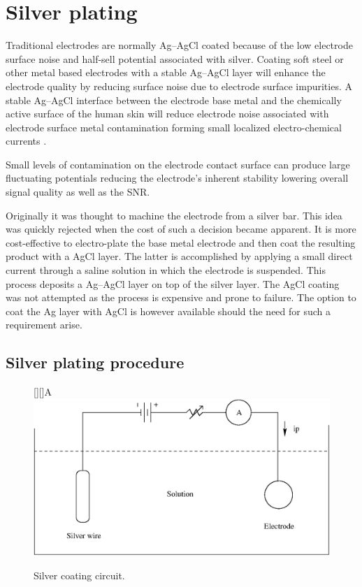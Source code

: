 \chapter{Silver plating}
\label{appendix:plating}

Traditional electrodes are normally Ag--AgCl coated because of the low
electrode surface noise and half-sell potential associated with
silver. Coating soft steel or other metal based electrodes with a
stable Ag--AgCl layer will enhance the electrode quality by reducing
surface noise due to electrode surface impurities. A stable Ag--AgCl
interface between the electrode base metal and the chemically active
surface of the human skin will reduce electrode noise associated with
electrode surface metal contamination forming small localized
electro-chemical currents \cite{electrode-stability}.

Small levels of contamination on the electrode contact surface can
produce large fluctuating potentials reducing the electrode's inherent
stability lowering overall signal quality as well as the SNR.

Originally it was thought to machine the electrode from a silver
bar. This idea was quickly rejected when the cost of such a decision
became apparent. It is more cost-effective to electro-plate the base
metal electrode and then coat the resulting product with a AgCl
layer. The latter is accomplished by applying a small direct current
through a saline solution in which the electrode is suspended. This
process deposits a Ag--AgCl layer on top of the silver layer. The AgCl
coating was not attempted as the process is expensive and prone to
failure. The option to coat the Ag layer with AgCl is however available
should the need for such a requirement arise.


\section{Silver plating procedure}
\begin{figure}[htbp]
		[][]{A}
		\psfrag{-}{--}
		\psfrag{+}{+}
        \includegraphics[width=\textwidth]{silver.eps}
        \caption{Silver coating circuit.}
        \label{fig:silver}
\end{figure}


